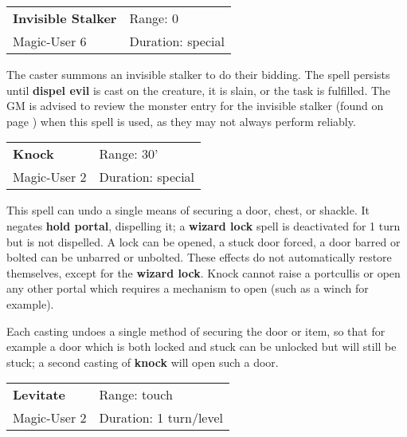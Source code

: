 \documentclass[a4paper,twoside,openany,10pt]{book}
\begin{document}
\begin{multicols}{2}
\smallskip\begin{flushleft} 
	\begin{tabularx}{0.45\textwidth}{@{}m{3.5cm}m{5.5cm}@{}} 
		\textbf{Invisible Stalker} & Range: 0\\
		Magic-User 6 & Duration: special\\
	\end{tabularx}\end{flushleft}

The caster summons an invisible stalker to do their bidding. The spell persists until \textbf{dispel evil} is cast on the creature, it is slain, or the task is fulfilled. The GM is advised to review the monster entry for the invisible stalker (found on page \hyperlink{invisible-stalker}{\pageref{invisible-stalker}}) when this spell is used, as they may not always perform reliably.

\smallskip\begin{flushleft} 
	\begin{tabularx}{0.45\textwidth}{@{}m{3.5cm}m{5.5cm}@{}} 
		\textbf{Knock} & Range: 30'\\
		Magic-User 2 & Duration: special\\
	\end{tabularx}\end{flushleft}

This spell can undo a single means of securing a door, chest, or shackle. It negates \textbf{hold portal}, dispelling it; a \textbf{wizard lock} spell is deactivated for 1 turn but is not dispelled. A lock can be opened, a stuck door forced, a door barred or bolted can be unbarred or unbolted. These effects do not automatically restore themselves, except for the \textbf{wizard lock}. Knock cannot raise a portcullis or open any other portal which requires a mechanism to open (such as a winch for example).

Each casting undoes a single method of securing the door or item, so that for example a door which is both locked and stuck can be unlocked but will still be stuck; a second casting of \textbf{knock} will open such a door.

\smallskip\begin{flushleft} 
	\begin{tabularx}{0.45\textwidth}{@{}m{3.5cm}m{5.5cm}@{}} 
		\textbf{Levitate} & Range: touch\\
		Magic-User 2 & Duration: 1 turn/level\\
	\end{tabularx}\end{flushleft}


\end{multicols}
\end{document}
